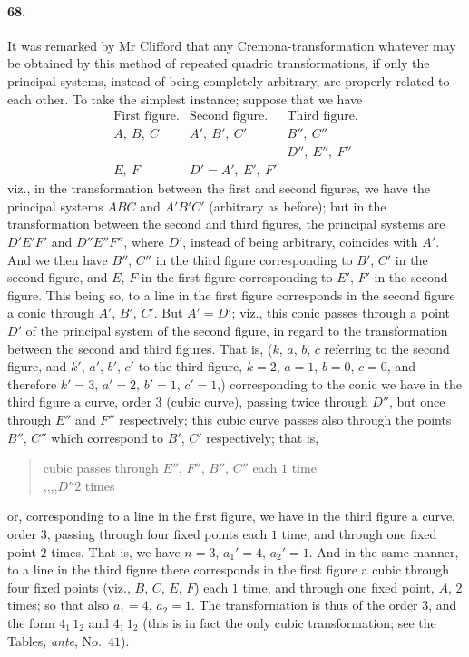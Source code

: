 \documentclass[11pt]{article}
\begin{document}
\paragraph{68.}
It was remarked by Mr Clifford that any Cremona-transformation whatever
may be obtained by this method of repeated quadric transformations, if
only the principal systems, instead of being completely arbitrary, are
properly related to each other. To take the simplest instance; suppose
that we have
\[
\begin{array}{lll}
\text{First figure.} & \text{Second figure.} & \text{Third figure.}\\
A,\ B,\ C            & A',\ B',\ C'           & B'',\ C''\\
                     &                       & D'',\ E'',\ F''\\
E,\ F                & D'=A',\ E',\ F'        &
\end{array}
\]
viz., in the transformation between the first and second figures, we
have the principal systems $ABC$ and $A'B'C'$ (arbitrary as before); but
in the transformation between the second and third figures, the
principal systems are $D'E'F'$ and $D''E''F''$, where $D'$, instead of
being arbitrary, coincides with $A'$. And we then have $B''$, $C''$ in
the third figure corresponding to $B'$, $C'$ in the second figure, and
$E$, $F$ in the first figure corresponding to $E'$, $F'$ in the second
figure. This being so, to a line in the first figure corresponds in the
second figure a conic through $A'$, $B'$, $C'$. But $A'=D'$; viz., this
conic passes through a point $D'$ of the principal system of the second
figure, in regard to the transformation between the second and third
figures. That is, ($k$, $a$, $b$, $c$ referring to the second figure, and
$k'$, $a'$, $b'$, $c'$ to the third figure, $k=2$, $a=1$, $b=0$, $c=0$,
and therefore $k'=3$, $a'=2$, $b'=1$, $c'=1$,) corresponding to the
conic we have in the third figure a curve, order $3$ (cubic curve),
passing twice through $D''$, but once through $E''$ and $F''$
respectively; this cubic curve passes also through the points $B''$,
$C''$ which correspond to $B'$, $C'$ respectively; that is,
\begin{quote}
cubic passes through $E''$, $F''$, $B''$, $C''$ each $1$ time\\
,,\quad ,,\qquad\qquad\qquad $D''$\qquad\qquad\qquad\qquad $2$ times
\end{quote}
or, corresponding to a line in the first figure, we have in the third
figure a curve, order $3$, passing through four fixed points each $1$
time, and through one fixed point $2$ times. That is, we have $n=3$,
$a_{1}'=4$, $a_{2}'=1$. And in the same manner, to a line in the third
figure there corresponds in the first figure a cubic through four fixed
points (viz., $B$, $C$, $E$, $F$) each $1$ time, and through one fixed
point, $A$, $2$ times; so that also $a_{1}=4$, $a_{2}=1$. The
transformation is thus of the order $3$, and the form $4_{1}\,1_{2}$ and
$4_{1}\,1_{2}$ (this is in fact the only cubic transformation; see the
Tables, \textit{ante}, No.~$41$).
\end{document}
